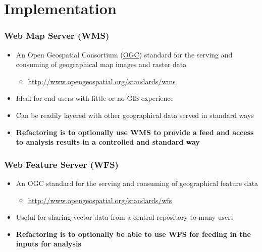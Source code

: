 \documentclass{beamer}
\begin{document}
\section{Implementation}

\begin{frame}[t]
\frametitle{Web Map Server (WMS)}
\begin{itemize}
  \item An Open Geospatial Consortium (\href{http://www.opengeospatial.org/}{OGC}) standard for the serving and consuming of geographical map images and raster data
  \begin{itemize}
    \item \href{http://www.opengeospatial.org/standards/wms}{http://www.opengeospatial.org/standards/wms}
  \end{itemize}
  \item Ideal for end users with little or no GIS experience
  \item Can be readily layered with other geographical data served in standard ways
  \item \textbf{Refactoring is to optionally use WMS to provide a feed and access to analysis results in a controlled and standard way}
\end{itemize}
\end{frame}

\begin{frame}[t]
\frametitle{Web Feature Server (WFS)}
\begin{itemize}
  \item An OGC standard for the serving and consuming of geographical feature data 
  \begin{itemize}
    \item \href{http://www.opengeospatial.org/standards/wfs}{http://www.opengeospatial.org/standards/wfs}
  \end{itemize}
  \item Useful for sharing vector data from a central repository to many users
  \item \textbf{Refactoring is to optionally be able to use WFS for feeding in the inputs for analysis}
\end{itemize}
\end{frame}
\end{document}
